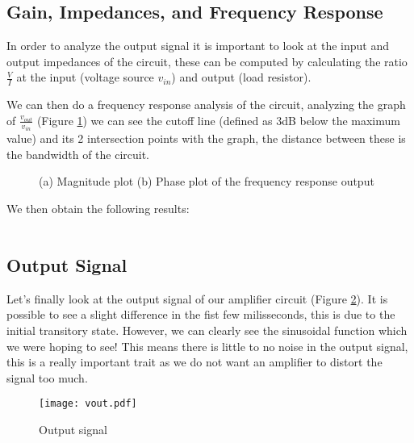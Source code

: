 \subsection{Gain, Impedances, and Frequency Response}
\hspace{12pt} In order to analyze the output signal it is important to look at the input and output impedances of the circuit, these can be computed by calculating the ratio $\frac{V}{I}$ at the input (voltage source $v_{in}$) and output (load resistor).

We can then do a frequency response analysis of the circuit, analyzing the graph of $\frac{v_{out}}{v_{in}}$ (Figure \ref{fig:gain_sim}) we can see the cutoff line (defined as 3dB below the maximum value) and its 2 intersection points with the graph, the distance between these is the bandwidth of the circuit.

\begin{figure}[h]
	\centering
	\caption{(a) Magnitude plot (b) Phase plot of the frequency response output}
	\label{fig:gain_sim}
\end{figure}

We then obtain the following results:
\begin{figure}[h]
	\centering
	\begin{tabular}{|c|c|}
	\hline
	
	\end{tabular}
\end{figure}

\vspace{30pt}

\subsection{Output Signal}
\hspace{12pt} Let's finally look at the output signal of our amplifier circuit (Figure \ref{fig:output_sim}). It is possible to see a slight difference in the fist few milisseconds, this is due to the initial transitory state. However, we can clearly see the sinusoidal function which we were hoping to see! This means there is little to no noise in the output signal, this is a really important trait as we do not want an amplifier to distort the signal too much.
\pagebreak

\begin{figure}[h]
	\centering
	\texttt{[image: vout.pdf]}
	\caption{Output signal}
	\label{fig:output_sim}
\end{figure}
\pagebreak
